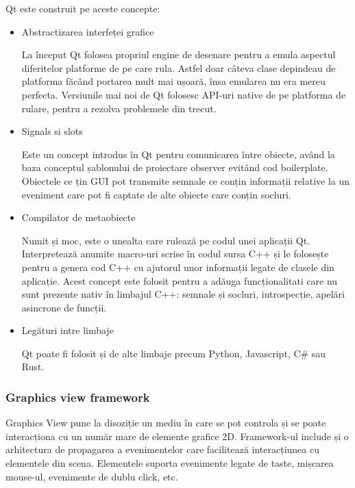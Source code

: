 Qt este construit pe aceste concepte:
\begin{itemize}
    \item Abstractizarea interfeței grafice
    
    La început Qt folosea propriul engine de desenare pentru a emula aspectul diferitelor platforme de pe care rula. 
    Astfel doar câteva clase depindeau de platforma făcând portarea mult mai ușoară, însa emularea nu era mereu perfecta. 
    Versiunile mai noi de Qt folosesc API-uri native de pe platforma de rulare, pentru a rezolva problemele din trecut.

    \item Signals si slots
    
    Este un concept introdus în Qt pentru comunicarea între obiecte, având la baza conceptul șablonului de proiectare observer 
    evitând cod boilerplate. Obiectele ce țin GUI pot transmite semnale ce conțin informații relative la un eveniment care pot 
    fi captate de alte obiecte care conțin socluri.

    \item Compilator de metaobiecte

    Numit și moc, este o unealta care rulează pe codul unei aplicații Qt. Interpretează anumite macro-uri scrise în codul 
    sursa C++ și le folosește pentru a genera cod C++ cu ajutorul unor informații legate de clasele din aplicație. 
    Acest concept este folosit pentru a adăuga funcționalitati care nu sunt prezente nativ în limbajul C++: semnale și socluri, 
    introspecție, apelări asincrone de funcții.

    \item Legături intre limbaje

    Qt poate fi folosit și de alte limbaje precum Python, Javascript, C\# sau Rust.
\end{itemize}

\subsubsection{Graphics view framework}

Graphics View pune la disoziție un mediu în care se pot controla și se poate interacționa cu un număr mare de elemente grafice 2D. 
Framework-ul include și o arhitectura de propagarea a evenimentelor care facilitează interacțiunea cu elementele din scena. 
Elementele suporta evenimente legate de taste, mișcarea mouse-ul, evenimente de dublu click, etc. \newline

